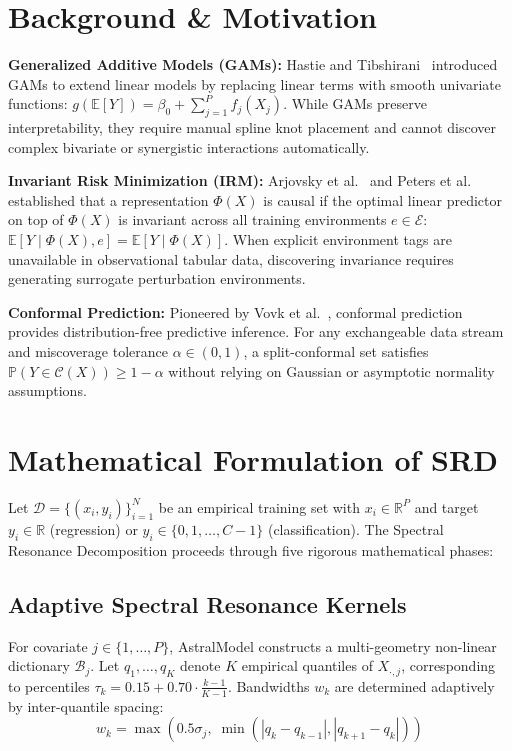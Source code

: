 \documentclass[11pt,a4paper]{article}
\begin{document}
\section{Background \& Motivation}

\textbf{Generalized Additive Models (GAMs):} Hastie and Tibshirani~\cite{hastie1990generalized} introduced GAMs to extend linear models by replacing linear terms with smooth univariate functions: $g(\mathbb{E}[Y]) = \beta_0 + \sum_{j=1}^P f_j(X_j)$. While GAMs preserve interpretability, they require manual spline knot placement and cannot discover complex bivariate or synergistic interactions automatically.

\textbf{Invariant Risk Minimization (IRM):} Arjovsky et al.~\cite{arjovsky2019invariant} and Peters et al.~\cite{peters2016causal} established that a representation $\Phi(X)$ is causal if the optimal linear predictor on top of $\Phi(X)$ is invariant across all training environments $e \in \mathcal{E}$: $\mathbb{E}[Y \mid \Phi(X), e] = \mathbb{E}[Y \mid \Phi(X)]$. When explicit environment tags are unavailable in observational tabular data, discovering invariance requires generating surrogate perturbation environments.

\textbf{Conformal Prediction:} Pioneered by Vovk et al.~\cite{vovk2005algorithmic}, conformal prediction provides distribution-free predictive inference. For any exchangeable data stream and miscoverage tolerance $\alpha \in (0, 1)$, a split-conformal set satisfies $\mathbb{P}(Y \in \mathcal{C}(X)) \ge 1 - \alpha$ without relying on Gaussian or asymptotic normality assumptions.

\section{Mathematical Formulation of SRD}

Let $\mathcal{D} = \{(x_i, y_i)\}_{i=1}^N$ be an empirical training set with $x_i \in \mathbb{R}^P$ and target $y_i \in \mathbb{R}$ (regression) or $y_i \in \{0, 1, \dots, C-1\}$ (classification). The Spectral Resonance Decomposition proceeds through five rigorous mathematical phases:

\subsection{Adaptive Spectral Resonance Kernels}

For covariate $j \in \{1, \dots, P\}$, AstralModel constructs a multi-geometry non-linear dictionary $\mathcal{B}_j$. Let $q_1, \dots, q_K$ denote $K$ empirical quantiles of $X_{\cdot, j}$, corresponding to percentiles $\tau_k = 0.15 + 0.70 \cdot \frac{k-1}{K-1}$. Bandwidths $w_k$ are determined adaptively by inter-quantile spacing:
\begin{equation}
    w_k = \max\left(0.5 \sigma_j, \; \min\left(|q_k - q_{k-1}|, |q_{k+1} - q_k|\right)\right)
\end{equation}
\end{document}
